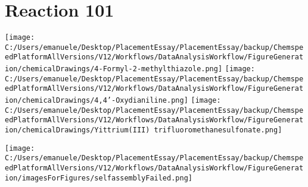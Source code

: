 \documentclass{article}%
\begin{document}
\section*{Reaction 101}%
%
\begin{scheme}[H]%
\begin{minipage}{0.5\textwidth}%
\texttt{[image: C:/Users/emanuele/Desktop/PlacementEssay/PlacementEssay/backup/ChemspeedPlatformAllVersions/V12/Workflows/DataAnalysisWorkflow/FigureGeneration/chemicalDrawings/4-Formyl-2-methylthiazole.png]}%
\texttt{[image: C:/Users/emanuele/Desktop/PlacementEssay/PlacementEssay/backup/ChemspeedPlatformAllVersions/V12/Workflows/DataAnalysisWorkflow/FigureGeneration/chemicalDrawings/4,4'-Oxydianiline.png]}%
\texttt{[image: C:/Users/emanuele/Desktop/PlacementEssay/PlacementEssay/backup/ChemspeedPlatformAllVersions/V12/Workflows/DataAnalysisWorkflow/FigureGeneration/chemicalDrawings/Yittrium(III) trifluoromethanesulfonate.png]}%
\end{minipage}%
\begin{minipage}{0.5\textwidth}%
\begin{center}%
\texttt{[image: C:/Users/emanuele/Desktop/PlacementEssay/PlacementEssay/backup/ChemspeedPlatformAllVersions/V12/Workflows/DataAnalysisWorkflow/FigureGeneration/imagesForFigures/selfassemblyFailed.png]}%
\end{center}%
\end{minipage}%
\caption{Self-assembly of components 1, 15, with Yittrium(III) in a 3.0:1.5:1.0 molar ratio in CH$_3$CN at 60\textdegree C for 40h. These are the reagents (starting materials) for reaction 101.}%
\end{scheme}%
\end{document}

